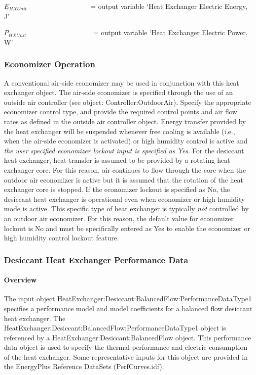 \({E_{HXUnit}}\) ~~~~~~~~~~~~~~~~~ = output variable `Heat Exchanger Electric Energy, J'

\({P_{HXUnit}}\) ~~~~~~~~~~~~~~~~~~ = output variable `Heat Exchanger Electric Power, W'

\subsubsection{Economizer Operation}\label{economizer-operation-2}

A conventional air-side economizer may be used in conjunction with this heat exchanger object. The air-side economizer is specified through the use of an outside air controller (see object: Controller:OutdoorAir). Specify the appropriate economizer control type, and provide the required control points and air flow rates as defined in the outside air controller object. Energy transfer provided by the heat exchanger will be suspended whenever free cooling is available (i.e., when the air-side economizer is activated) or high humidity control is active and \emph{the user specified economizer lockout input is specified as Yes}. For the desiccant heat exchanger, heat transfer is assumed to be provided by a rotating heat exchanger core. For this reason, air continues to flow through the core when the outdoor air economizer is active but it is assumed that the rotation of the heat exchanger core is stopped. If the economizer lockout is specified as No, the desiccant heat exchanger is operational even when economizer or high humidity mode is active. This specific type of heat exchanger is typically \emph{not} controlled by an outdoor air economizer. For this reason, the default value for economizer lockout is No and must be specifically entered as Yes to enable the economizer or high humidity control lockout feature.

\subsubsection{Desiccant Heat Exchanger Performance Data}\label{desiccant-heat-exchanger-performance-data}

\paragraph{Overview}\label{overview-3-004}

The input object HeatExchanger:Desiccant:BalancedFlow:PerformanceDataType1 specifies a performance model and model coefficients for a balanced flow desiccant heat exchanger. The HeatExchanger:Desiccant:BalancedFlow:PerformanceDataType1 object is referenced by a HeatExchanger:Desiccant:BalancedFlow object. This performance data object is used to specify the thermal performance and electric consumption of the heat exchanger. Some representative inputs for this object are provided in the EnergyPlus Reference DataSets (PerfCurves.idf).

